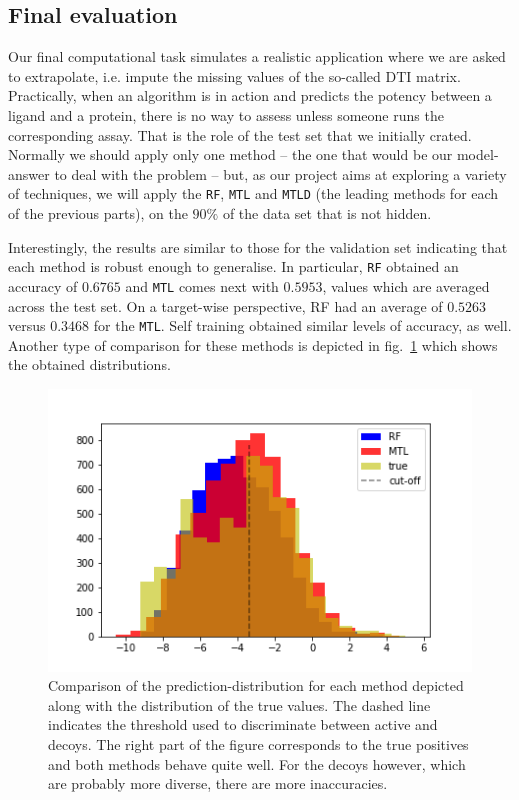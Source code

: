 \documentclass[10pt]{article}
\begin{document}
\subsection{Final evaluation}
Our final computational task simulates a realistic application where we are asked to extrapolate, i.e. impute the missing values of the so-called DTI matrix. Practically, when an algorithm is in action and predicts the potency between a ligand and a protein, there is no way to assess unless someone runs the corresponding assay. That is the role of the test set that we initially crated. Normally we should apply only one method -- the one that would be our model-answer to deal with the problem -- but, as our project aims at exploring a variety of techniques, we will apply the \texttt{RF}, \texttt{MTL} and \texttt{MTLD} (the leading methods for each of the previous parts), on the $90\%$ of the data set that is not hidden.

Interestingly, the results are similar to those for the validation set indicating that each method is robust enough to generalise. In particular, \texttt{RF} obtained an accuracy of $0.6765$ and \texttt{MTL} comes next with $0.5953$, values which are averaged across the test set. On a target-wise perspective, RF had an average of $0.5263$ versus $0.3468$ for the \texttt{MTL}. Self training obtained similar levels of accuracy, as well. Another type of comparison  for these methods is depicted in fig.~\ref{fig:test} which shows the obtained distributions. 

\begin{figure}[h]
	\begin{minipage}[c]{0.6\textwidth}
		\includegraphics[width=\textwidth]{figs/Distr-Testset.png}
	\end{minipage}\hfill
	\begin{minipage}[c]{0.38\textwidth}
		\caption{{\small Comparison of the prediction-distribution for each method depicted along with the distribution of the true values. The dashed line indicates the threshold used to discriminate between active and decoys. The right part of the figure corresponds to the true positives and both methods behave quite well. For the decoys however, which are probably more diverse, there are more inaccuracies. }} 	
		\label{fig:test}
	\end{minipage}
\end{figure}
\end{document}
